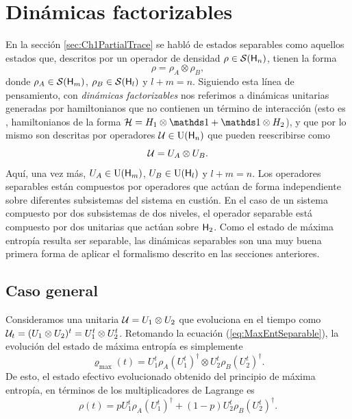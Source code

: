 \section{Dinámicas factorizables}

En la sección \ref{sec:Ch1PartialTrace} se habló de estados separables como aquellos estados que, descritos por un operador de densidad $\rho\in\mathcal{S}({\sf H}_{n})$, tienen la forma
\begin{equation*}
    \rho=\rho_{A}\otimes\rho_{B},
\end{equation*}
donde $\rho_{A}\in\mathcal{S}({\sf H}_{m})$, $\rho_{B}\in\mathcal{S}({\sf H}_{l})$ y $l+m=n$. Siguiendo esta línea de pensamiento, con \textit{dinámicas factorizables} nos referimos a dinámicas unitarias generadas por hamiltonianos que no contienen un término de interacción (esto es , hamiltonianos de la forma $\mcH=H_{1}\otimes\Id+\Id\otimes H_{2}$), y que por lo mismo son descritas por operadores $\mathcal{U}\in\text{U}({\sf H}_{n})$ que pueden reescribirse como
\begin{equation*}
    \mathcal{U}=U_{A}\otimes U_{B}.
\end{equation*}
Aquí, una vez más, $U_{A}\in\text{U}({\sf H}_{m})$, $U_{B}\in\text{U}({\sf H}_{l})$ y $l+m=n$. Los operadores separables están compuestos por operadores que actúan de forma independiente sobre diferentes subsistemas del sistema en custión. En el caso de un sistema compuesto por dos subsistemas de dos niveles, el operador separable está compuesto por dos unitarias que actúan sobre ${\sf H}_{2}$. Como el estado de máxima entropía resulta ser separable, las dinámicas separables son una muy buena primera forma de aplicar el formalismo descrito en las secciones anteriores.

\subsection{Caso general}

Consideramos una unitaria $\mathcal{U}=U_{1}\otimes U_{2}$ que evoluciona en el tiempo como $\mathcal{U}_{t}=(U_{1}\otimes U_{2})^{t}=U_{1}^{t}\otimes U_{2}^{t}$. Retomando la ecuación (\ref{eq:MaxEntSeparable}), la evolución del estado de máxima entropía es simplemente
\begin{equation*}
    \varrho_{\max}(t)=U_{1}^{t}\rho_{A}(U_{1}^{t})^{\dag}\otimes U_{2}^{t}\rho_{B} (U_{2}^{t})^{\dag}.
\end{equation*}
De esto, el estado efectivo evolucionado obtenido del principio de máxima entropía, en términos de los multiplicadores de Lagrange es
\begin{equation}\label{eq:SeparableEvolution}
    \rho(t)=pU_{1}^{t}\rho_{A}(U_{1}^{t})^{\dag}+(1-p)U_{2}^{t}\rho_{B} (U_{2}^{t})^{\dag}.
\end{equation}

